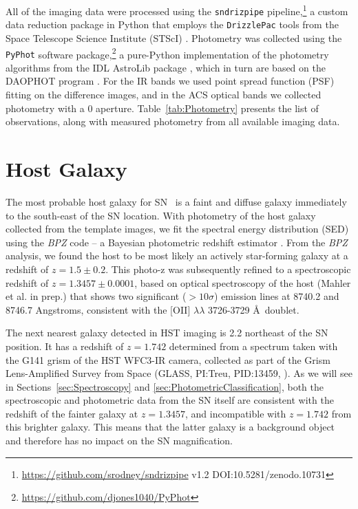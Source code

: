 All of the imaging data were processed using the {\tt sndrizpipe}
pipeline,\footnote{\url{https://github.com/srodney/sndrizpipe} v1.2
DOI:10.5281/zenodo.10731} a custom data reduction package in Python
that employs the {\tt DrizzlePac} tools from the Space Telescope
Science Institute (STScI) \citep{Fruchter:2010}.  Photometry was
collected using the {\tt PyPhot} software
package,\footnote{\url{https://github.com/djones1040/PyPhot}} a
pure-Python implementation of the photometry algorithms from the IDL
AstroLib package \citep{Landsman:1993}, which in turn are based on the
DAOPHOT program \citep{Stetson:1987}.  For the IR bands we used point
spread function (PSF) fitting on the difference images, and in the ACS
optical bands we collected photometry with a
0 aperture. Table~\ref{tab:Photometry} presents the list of
observations, along with measured photometry from all available
imaging data.

\section{Host Galaxy}
\label{sec:HostGalaxy}

The most probable host galaxy for SN \tomas\ is a faint and diffuse
galaxy immediately to the south-east of the SN location.  With
photometry of the host galaxy collected from the template images, we
fit the spectral energy distribution (SED) using the {\it BPZ} code --
a Bayesian photometric redshift estimator \citep{Benitez:2000}. 
From the {\it BPZ} analysis, we found the host to be most likely an
actively star-forming galaxy at a redshift of
$z=1.5\pm0.2$.  This photo-z was subsequently refined to a
spectroscopic redshift of $z=1.3457\pm0.0001$, based on optical
spectroscopy of the host (Mahler et al. in prep.) that shows two
significant ($>10\sigma$) emission lines at 8740.2 and 8746.7
Angstroms, consistent with the [OII] $\lambda\lambda$ 3726-3729 \AA\
doublet.  

The next nearest galaxy detected in HST imaging is 2.2\arcsec
northeast of the SN position. It has a redshift of $z=1.742$
determined from a spectrum taken with the G141 grism of the HST
WFC3-IR camera, collected as part of the Grism Lens-Amplified Survey
from Space (GLASS, PI:Treu, PID:13459, \citealt{Treu:2015,Schmidt:2014}).  As we
will see in Sections~\ref{sec:Spectroscopy}
and \ref{sec:PhotometricClassification}, both the spectroscopic and
photometric data from the SN itself are consistent with the
redshift of the fainter galaxy at $z=1.3457$, and
incompatible with $z=1.742$ from this brighter galaxy.  This means
that the latter galaxy is a background object and therefore has no
impact on the SN magnification.

